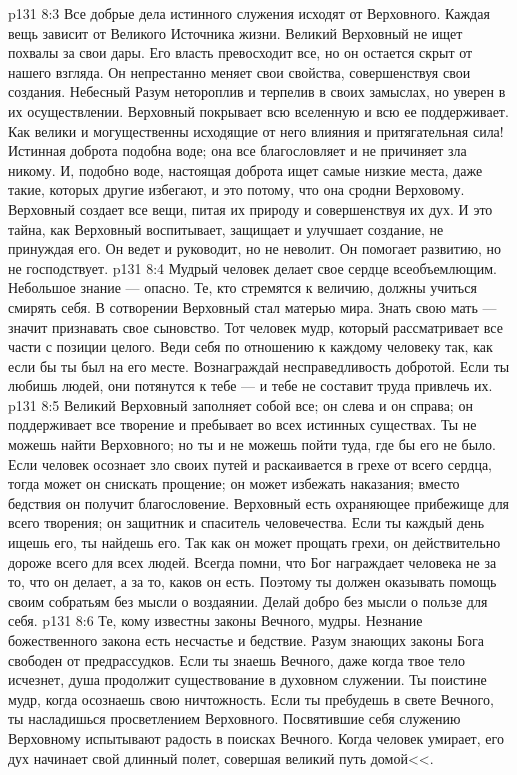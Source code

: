 \vs p131 8:3 Все добрые дела истинного служения исходят от Верховного. Каждая вещь зависит от Великого Источника жизни. Великий Верховный не ищет похвалы за свои дары. Его власть превосходит все, но он остается скрыт от нашего взгляда. Он непрестанно меняет свои свойства, совершенствуя свои создания. Небесный Разум нетороплив и терпелив в своих замыслах, но уверен в их осуществлении. Верховный покрывает всю вселенную и всю ее поддерживает. Как велики и могущественны исходящие от него влияния и притягательная сила! Истинная доброта подобна воде; она все благословляет и не причиняет зла никому. И, подобно воде, настоящая доброта ищет самые низкие места, даже такие, которых другие избегают, и это потому, что она сродни Верховому. Верховный создает все вещи, питая их природу и совершенствуя их дух. И это тайна, как Верховный воспитывает, защищает и улучшает создание, не принуждая его. Он ведет и руководит, но не неволит. Он помогает развитию, но не господствует.
\vs p131 8:4 Мудрый человек делает свое сердце всеобъемлющим. Небольшое знание --- опасно. Те, кто стремятся к величию, должны учиться смирять себя. В сотворении Верховный стал матерью мира. Знать свою мать --- значит признавать свое сыновство. Тот человек мудр, который рассматривает все части с позиции целого. Веди себя по отношению к каждому человеку так, как если бы ты был на его месте. Вознаграждай несправедливость добротой. Если ты любишь людей, они потянутся к тебе --- и тебе не составит труда привлечь их.
\vs p131 8:5 Великий Верховный заполняет собой все; он слева и он справа; он поддерживает все творение и пребывает во всех истинных существах. Ты не можешь найти Верховного; но ты и не можешь пойти туда, где бы его не было. Если человек осознает зло своих путей и раскаивается в грехе от всего сердца, тогда может он снискать прощение; он может избежать наказания; вместо бедствия он получит благословение. Верховный есть охраняющее прибежище для всего творения; он защитник и спаситель человечества. Если ты каждый день ищешь его, ты найдешь его. Так как он может прощать грехи, он действительно дороже всего для всех людей. Всегда помни, что Бог награждает человека не за то, что он делает, а за то, каков он есть. Поэтому ты должен оказывать помощь своим собратьям без мысли о воздаянии. Делай добро без мысли о пользе для себя.
\vs p131 8:6 Те, кому известны законы Вечного, мудры. Незнание божественного закона есть несчастье и бедствие. Разум знающих законы Бога свободен от предрассудков. Если ты знаешь Вечного, даже когда твое тело исчезнет, душа продолжит существование в духовном служении. Ты поистине мудр, когда осознаешь свою ничтожность. Если ты пребудешь в свете Вечного, ты насладишься просветлением Верховного. Посвятившие себя служению Верховному испытывают радость в поисках Вечного. Когда человек умирает, его дух начинает свой длинный полет, совершая великий путь домой<<.
